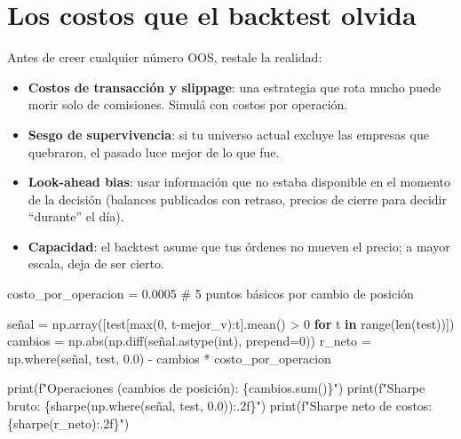 \documentclass[
  spanish,
  letterpaper,
  DIV=11,
  numbers=noendperiod]{scrreprt}
\newenvironment{Shaded}{\begin{snugshade}}{\end{snugshade}}
\newcommand{\BuiltInTok}[1]{\textcolor[rgb]{0.00,0.23,0.31}{#1}}
\newcommand{\CommentTok}[1]{\textcolor[rgb]{0.37,0.37,0.37}{#1}}
\newcommand{\ControlFlowTok}[1]{\textcolor[rgb]{0.00,0.23,0.31}{\textbf{#1}}}
\newcommand{\DecValTok}[1]{\textcolor[rgb]{0.68,0.00,0.00}{#1}}
\newcommand{\FloatTok}[1]{\textcolor[rgb]{0.68,0.00,0.00}{#1}}
\newcommand{\KeywordTok}[1]{\textcolor[rgb]{0.00,0.23,0.31}{\textbf{#1}}}
\newcommand{\NormalTok}[1]{\textcolor[rgb]{0.00,0.23,0.31}{#1}}
\newcommand{\OperatorTok}[1]{\textcolor[rgb]{0.37,0.37,0.37}{#1}}
\newcommand{\SpecialCharTok}[1]{\textcolor[rgb]{0.37,0.37,0.37}{#1}}
\newcommand{\SpecialStringTok}[1]{\textcolor[rgb]{0.13,0.47,0.30}{#1}}
\providecommand{\tightlist}{%
  \setlength{\itemsep}{0pt}\setlength{\parskip}{0pt}}
\begin{document}
\section{Los costos que el backtest
olvida}\label{los-costos-que-el-backtest-olvida}

Antes de creer cualquier número OOS, restale la realidad:

\begin{itemize}
\tightlist
\item
  \textbf{Costos de transacción y slippage}: una estrategia que rota
  mucho puede morir solo de comisiones. Simulá con costos por operación.
\item
  \textbf{Sesgo de supervivencia}: si tu universo actual excluye las
  empresas que quebraron, el pasado luce mejor de lo que fue.
\item
  \textbf{Look-ahead bias}: usar información que no estaba disponible en
  el momento de la decisión (balances publicados con retraso, precios de
  cierre para decidir ``durante'' el día).
\item
  \textbf{Capacidad}: el backtest asume que tus órdenes no mueven el
  precio; a mayor escala, deja de ser cierto.
\end{itemize}

\label{costos}
\begin{Shaded}
\begin{Highlighting}[]
\NormalTok{costo\_por\_operacion }\OperatorTok{=} \FloatTok{0.0005}   \CommentTok{\# 5 puntos básicos por cambio de posición}

\NormalTok{señal }\OperatorTok{=}\NormalTok{ np.array([test[}\BuiltInTok{max}\NormalTok{(}\DecValTok{0}\NormalTok{, t}\OperatorTok{{-}}\NormalTok{mejor\_v):t].mean() }\OperatorTok{\textgreater{}} \DecValTok{0} \ControlFlowTok{for}\NormalTok{ t }\KeywordTok{in} \BuiltInTok{range}\NormalTok{(}\BuiltInTok{len}\NormalTok{(test))])}
\NormalTok{cambios }\OperatorTok{=}\NormalTok{ np.}\BuiltInTok{abs}\NormalTok{(np.diff(señal.astype(}\BuiltInTok{int}\NormalTok{), prepend}\OperatorTok{=}\DecValTok{0}\NormalTok{))}
\NormalTok{r\_neto }\OperatorTok{=}\NormalTok{ np.where(señal, test, }\FloatTok{0.0}\NormalTok{) }\OperatorTok{{-}}\NormalTok{ cambios }\OperatorTok{*}\NormalTok{ costo\_por\_operacion}

\BuiltInTok{print}\NormalTok{(}\SpecialStringTok{f"Operaciones (cambios de posición): }\SpecialCharTok{\{}\NormalTok{cambios}\SpecialCharTok{.}\BuiltInTok{sum}\NormalTok{()}\SpecialCharTok{\}}\SpecialStringTok{"}\NormalTok{)}
\BuiltInTok{print}\NormalTok{(}\SpecialStringTok{f"Sharpe bruto: }\SpecialCharTok{\{}\NormalTok{sharpe(np.where(señal, test, }\FloatTok{0.0}\NormalTok{))}\SpecialCharTok{:.2f\}}\SpecialStringTok{"}\NormalTok{)}
\BuiltInTok{print}\NormalTok{(}\SpecialStringTok{f"Sharpe neto de costos: }\SpecialCharTok{\{}\NormalTok{sharpe(r\_neto)}\SpecialCharTok{:.2f\}}\SpecialStringTok{"}\NormalTok{)}
\end{Highlighting}
\end{Shaded}
\end{document}
